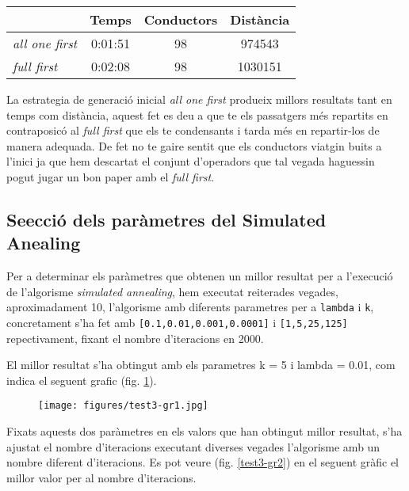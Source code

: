\begin{center}
\begin{tabular}{l|ccc}
         & Temps & Conductors & Distància\\
\hline
\emph{all one first} & 0:01:51 & 98 & 974543  \\
\emph{full first} & 0:02:08 & 98 & 1030151 
\end{tabular}
\end{center}
                                                                                                                                                                                  
La estrategia de generació inicial \emph{all one first} produeix millors resultats tant en temps com distància,
aquest fet es deu a que te els passatgers més repartits en contraposicó al \emph{full first} que els te
condensants i tarda més en repartir-los de manera adequada. De fet no te gaire sentit que els conductors
viatgin buits a l'inici ja que hem descartat el conjunt d'operadors que tal vegada haguessin pogut
jugar un bon paper amb el \emph{full first}.

\subsection{Se\lgem ecció dels paràmetres del Simulated Anealing}
Per a determinar els paràmetres que obtenen un millor resultat per a l'execució de l'algorisme \emph{simulated annealing},
hem executat reiterades vegades, aproximadament 10, l'algorisme amb diferents parametres per a \texttt{lambda} i \texttt{k}, concretament s'ha fet amb
\texttt{[0.1,0.01,0.001,0.0001]} i \texttt{[1,5,25,125]} repectivament, fixant el nombre d'iteracions en 2000.

El millor resultat s'ha obtingut amb els parametres k = 5 i lambda = 0.01, com indica el seguent grafic (fig. \ref{test3-gr1}).

\begin{figure}[H]
\begin{center} 
 \texttt{[image: figures/test3-gr1.jpg]}
\label{test3-gr1}
\end{center}
\end{figure}

Fixats aquests dos paràmetres en els valors que han obtingut millor resultat, s'ha ajustat el nombre d'iteracions executant diverses 
vegades l'algorisme amb un nombre diferent d'iteracions. Es pot veure (fig. \ref{test3-gr2}) en el seguent gràfic el millor valor per al nombre d'iteracions.

